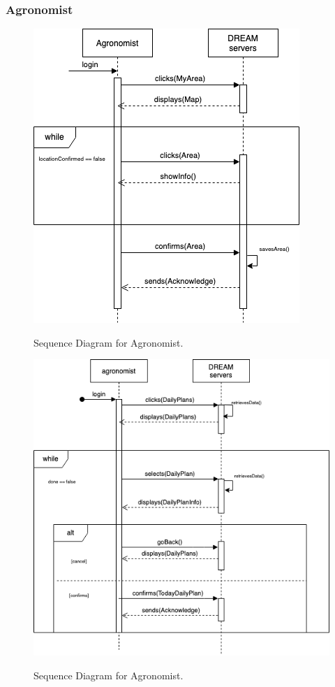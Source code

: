 \subsubsection{Agronomist}

\begin{figure}[hbt!]
\centering
\includegraphics[scale=0.6]{Files/sequence_disgrams/thePNGs/agronomist_choosingLocation.png}\\
\caption{\label{tab:addOne{figure_counter}}Sequence Diagram for Agronomist.}
\end{figure}


\begin{figure}[hbt!]
\centering
\includegraphics[scale=0.6]{Files/sequence_disgrams/thePNGs/agronomist_confirmPlan.png}\\
\caption{\label{tab:addOne{figure_counter}}Sequence Diagram for Agronomist.}
\end{figure}

